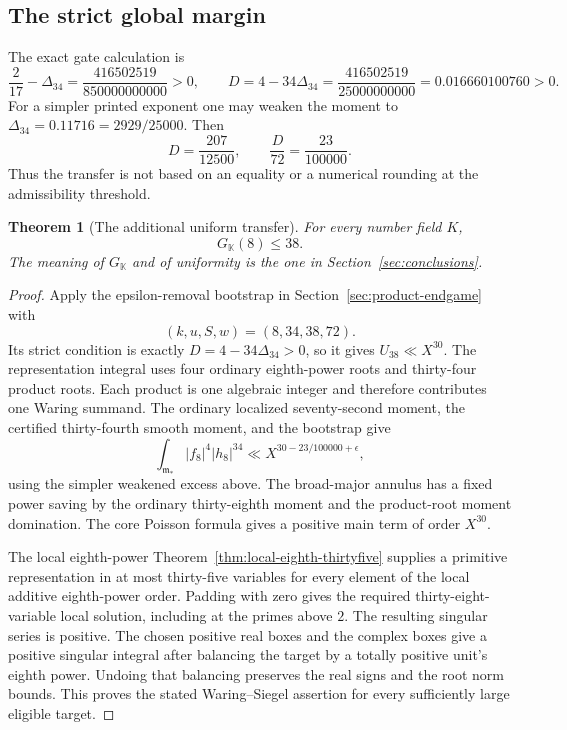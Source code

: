 \documentclass[11pt,reqno]{amsart}
\numberwithin{equation}{section}
\newtheorem{theorem}{Theorem}[section]
\theoremstyle{definition}
\begin{document}
\subsection{The strict global margin}

The exact gate calculation is
\[
 \frac2{17}-\Delta_{34}
   =\frac{416502519}{850000000000}>0,
 \qquad
 D=4-34\Delta_{34}
   =\frac{416502519}{25000000000}
   =0.016660100760>0.
\]
For a simpler printed exponent one may weaken the moment to
$\Delta_{34}=0.11716=2929/25000$. Then
\[
 D=\frac{207}{12500},\qquad \frac{D}{72}=\frac{23}{100000}.
\]
Thus the transfer is not based on an equality or a numerical rounding
at the admissibility threshold.

\begin{theorem}[The additional uniform transfer]
\label{thm:eighth-transfer}
For every number field $K$,
\[
                         \boxed{G_{\mathbb K}(8)\le38.}
\]
The meaning of $G_{\mathbb K}$ and of uniformity is the one in
Section~\ref{sec:conclusions}.
\end{theorem}

\begin{proof}
Apply the epsilon-removal bootstrap in Section~\ref{sec:product-endgame}
with
\[
             (k,u,S,w)=(8,34,38,72).
\]
Its strict condition is exactly $D=4-34\Delta_{34}>0$, so it gives
$U_{38}\ll X^{30}$. The representation integral uses four ordinary
eighth-power roots and thirty-four product roots. Each product is one
algebraic integer and therefore contributes one Waring summand.
The ordinary localized seventy-second moment, the certified thirty-fourth
smooth moment, and the bootstrap give
\[
 \int_{\mathfrak m_*}|f_8|^4|h_8|^{34}
 \ll X^{30-23/100000+\epsilon},
\]
using the simpler weakened excess above. The broad-major annulus has
a fixed power saving by the ordinary thirty-eighth moment and the
product-root moment domination. The core Poisson formula gives a
positive main term of order $X^{30}$.

The local eighth-power Theorem~\ref{thm:local-eighth-thirtyfive} supplies a
primitive representation in at most thirty-five variables for every
element of the local additive eighth-power order. Padding with zero
gives the required thirty-eight-variable local solution, including at
the primes above $2$. The resulting singular series is positive.
The chosen positive real boxes and the complex boxes give a positive
singular integral after balancing the target by a totally positive
unit's eighth power. Undoing that balancing preserves the real signs
and the root norm bounds. This proves the stated Waring--Siegel assertion
for every sufficiently large eligible target.
\end{proof}
\end{document}
